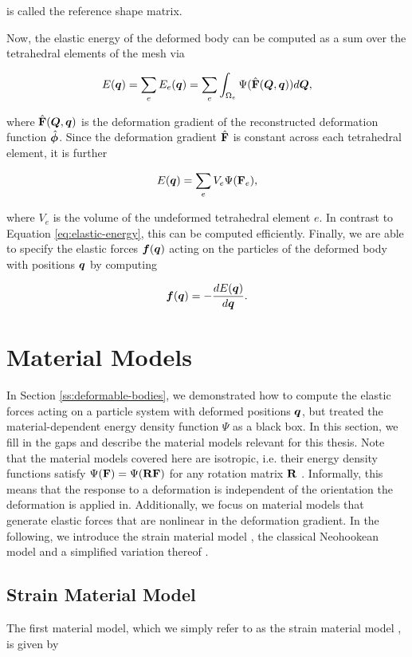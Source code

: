 \noindent is called the reference shape matrix.

Now, the elastic energy of the deformed body can be computed as a sum over the tetrahedral elements of the mesh via

\[
    E(\bm{q}) = \sum_e E_e(\bm{q}) = \sum_e \int_{\Omega_e} \Psi(\hat{\mathbf{F}}(\bm{Q}, \bm{q})) d\bm{Q},
\]

\noindent where $\hat{\mathbf{F}}(\bm{Q}, \bm{q})$ is the deformation gradient of the reconstructed deformation 
function $\hat{\bm{\phi}}$. Since the deformation gradient $\hat{\mathbf{F}}$ is constant across each tetrahedral element, 
it is further

\[
    E(\bm{q}) = \sum_e V_e \Psi(\mathbf{F}_e),
\]

\noindent where $V_e$ is the volume of the undeformed tetrahedral element $e$. In contrast to Equation \ref{eq:elastic-energy}, this can be computed efficiently. 
Finally, we are able to specify the elastic forces $\bm{f}(\bm{q})$ acting on the particles of the deformed body with positions $\bm{q}$ by computing

\[
    \bm{f}(\bm{q}) = -\frac{dE(\bm{\bm{q}})}{d\bm{q}}.
\]

\section{Material Models}\label{ss:material-models}
In Section \ref{ss:deformable-bodies}, we demonstrated how to compute the elastic forces acting on a particle system with deformed positions 
$\bm{q}$, but treated the material-dependent energy density function $\Psi$ as a black box. In this section, we fill in the gaps and describe the material
models relevant for this thesis. Note that the material models covered here are isotropic, i.e. their energy density functions satisfy $\Psi(\mathbf{F}) = 
\Psi(\mathbf{R}\mathbf{F})$ for any rotation matrix $\mathbf{R}$ \cite{sifakis2012}. Informally, this means that the response to a deformation is 
independent of the orientation the deformation is applied in. Additionally, we focus on material models that generate elastic forces that are nonlinear 
in the deformation gradient. In the following, we introduce the strain material model \cite{bouaziz2014}, the classical Neohookean model and a simplified 
variation thereof \cite{smith2018}.

\subsection{Strain Material Model}\label{ss:strain-material}
The first material model, which we simply refer to as the strain material model \cite{bouaziz2014}, is given by

